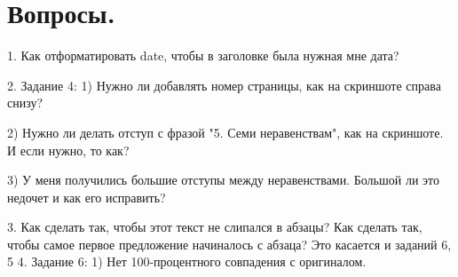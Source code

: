 \documentclass[a4paper,12pt]{article} %
\begin{document}
	\section{Вопросы.}
	1. Как отформатировать date, чтобы в заголовке была нужная мне дата?
	
	2. Задание 4:
		1) Нужно ли добавлять номер страницы, как на скриншоте справа снизу?
		
		2) Нужно ли делать отступ с фразой "5. Семи неравенствам", как на скриншоте. И если нужно, то как?
		
		3) У меня получились большие отступы между неравенствами. Большой ли это недочет и как его исправить?
		
	3. Как сделать так, чтобы этот текст не слипался в абзацы? Как сделать так, чтобы самое первое предложение начиналось с абзаца? Это касается и заданий 6, 5
	4. Задание 6:
		1) Нет 100-процентного совпадения с оригиналом.
	
\end{document}
